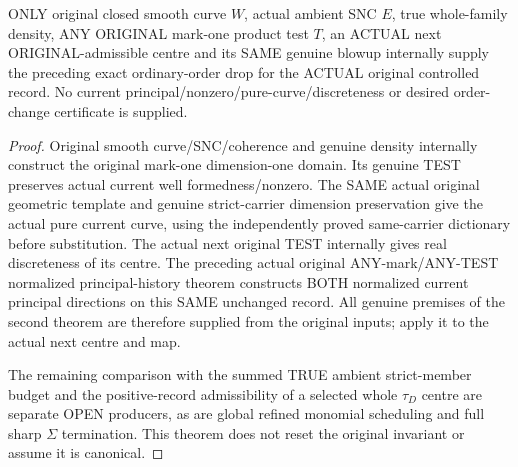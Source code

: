 \begin{theorem}
\label{hir:sharp-original-curve-product-controlled-ordinary-order-shift}
\leanok
ONLY original closed smooth curve $W$, actual ambient SNC $E$, true
whole-family density, ANY ORIGINAL mark-one product test $T$, an ACTUAL
next ORIGINAL-admissible centre and its SAME genuine blowup internally
supply the preceding exact ordinary-order drop for the ACTUAL original
controlled record. No current principal/nonzero/pure-curve/discreteness
or desired order-change certificate is supplied.
\end{theorem}
\begin{proof}
Original smooth curve/SNC/coherence and genuine density internally
construct the original mark-one dimension-one domain. Its genuine TEST
preserves actual current well formedness/nonzero. The SAME actual original
geometric template and genuine strict-carrier dimension preservation give
the actual pure current curve, using the independently proved same-carrier
dictionary before substitution. The actual next original TEST internally
gives real discreteness of its centre. The preceding actual original
ANY-mark/ANY-TEST normalized principal-history theorem constructs BOTH
normalized current principal directions on this SAME unchanged record.
All genuine premises of the second theorem are therefore supplied from
the original inputs; apply it to the actual next centre and map.

The remaining comparison with the summed TRUE ambient strict-member
budget and the positive-record admissibility of a selected whole
$\tau_D$ centre are separate OPEN producers, as are global refined
monomial scheduling and full sharp $\Sigma$ termination. This theorem
does not reset the original invariant or assume it is canonical.
\end{proof}
